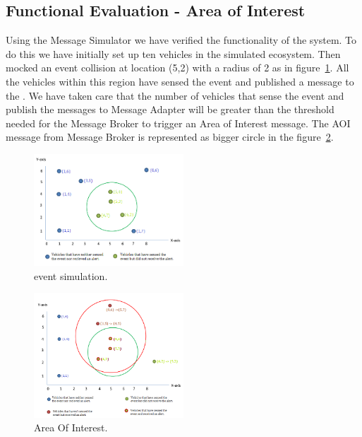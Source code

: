 \subsection{Functional Evaluation - Area of Interest}
Using the Message Simulator we have verified the functionality of the
system.  To do this we have initially set up ten vehicles in the
simulated ecosystem.  Then mocked an event collision at location (5,2)
with a radius of 2 as in figure~\ref{fig:simulated}. All the vehicles
within this region have sensed the event and published a message to
the \name. We have taken care that the number of vehicles that sense
the event and publish the messages to Message Adapter will be greater
than the threshold needed for the Message Broker to trigger an Area of
Interest message. The AOI message from Message Broker is represented
as bigger circle in the figure~\ref{fig:aoi}.

\begin{figure}[ht]
  \begin{center}
    \includegraphics[width=0.5\textwidth]{figs/simulated.png}
    \caption{\name event simulation.}
    \label{fig:simulated}
  \end{center}
\end{figure}

\begin{figure}[ht]
  \begin{center}
    \includegraphics[width=0.5\textwidth]{figs/aoi.png}
    \caption{\name Area Of Interest.}
    \label{fig:aoi}
  \end{center}
\end{figure}

